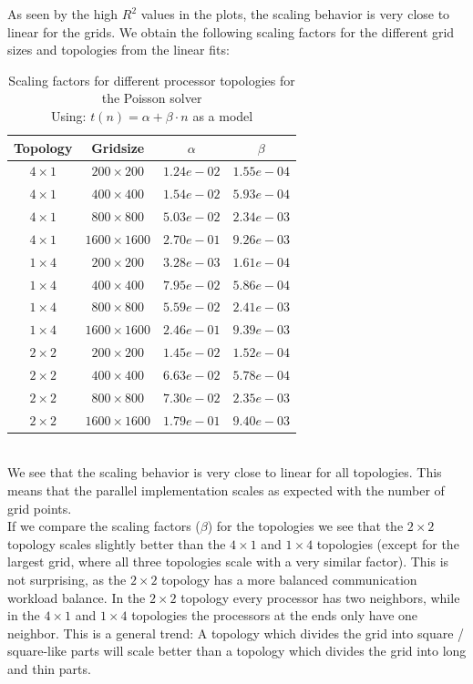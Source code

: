 As seen by the high $R^2$ values in the plots, the scaling behavior is very close to linear for the grids. We obtain the following scaling factors for the different grid sizes and topologies from the linear fits:
\begin{table}[H]
    \centering
    \begin{tabular}{|c|c|c|c|}
        \hline
        Topology & Gridsize & $\alpha$ & $\beta$ \\\hline
        $4\times 1$ & $200\times 200$ & $1.24e-02$ & $1.55e-04$ \\ \hline
        $4\times 1$ & $400\times 400$ & $1.54e-02$ & $5.93e-04$ \\ \hline
        $4\times 1$ & $800\times 800$ & $5.03e-02$ & $2.34e-03$ \\ \hline
        $4\times 1$ & $1600\times 1600$ & $2.70e-01$ & $9.26e-03$ \\ \hline
        $1\times 4$ & $200\times 200$ & $3.28e-03$ & $1.61e-04$ \\ \hline
        $1\times 4$ & $400\times 400$ & $7.95e-02$ & $5.86e-04$ \\ \hline
        $1\times 4$ & $800\times 800$ & $5.59e-02$ & $2.41e-03$ \\ \hline
        $1\times 4$ & $1600\times 1600$ & $2.46e-01$ & $9.39e-03$ \\ \hline
        $2\times 2$ & $200\times 200$ & $1.45e-02$ & $1.52e-04$ \\ \hline
        $2\times 2$ & $400\times 400$ & $6.63e-02$ & $5.78e-04$ \\ \hline
        $2\times 2$ & $800\times 800$ & $7.30e-02$ & $2.35e-03$ \\ \hline
        $2\times 2$ & $1600\times 1600$ & $1.79e-01$ & $9.40e-03$ \\ \hline
    \end{tabular}
    \caption{Scaling factors for different processor topologies for the Poisson solver\\Using: $t(n) = \alpha + \beta \cdot n$ as a model}
\end{table}
\\
We see that the scaling behavior is very close to linear for all topologies. This means that the parallel implementation scales as expected with the number of grid points.\\
If we compare the scaling factors ($\beta$) for the topologies we see that the $2\times 2$ topology scales slightly better than the $4\times 1$ and $1\times 4$ topologies (except for the largest grid, where all three topologies scale with a very similar factor). This is not surprising, as the $2\times 2$ topology has a more balanced communication workload balance. In the $2\times 2$ topology every processor has two neighbors, while in the $4\times 1$ and $1\times 4$ topologies the processors at the ends only have one neighbor. This is a general trend: A topology which divides the grid into square / square-like parts will scale better than a topology which divides the grid into long and thin parts.\\
